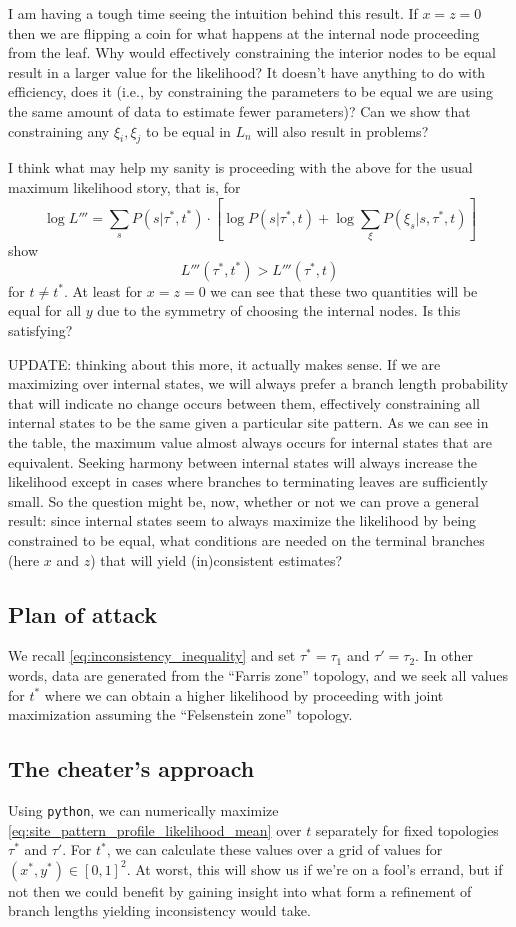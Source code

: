 I am having a tough time seeing the intuition behind this result.
If $x=z=0$ then we are flipping a coin for what happens at the internal node proceeding from the leaf.
Why would effectively constraining the interior nodes to be equal result in a larger value for the likelihood?
It doesn't have anything to do with efficiency, does it (i.e., by constraining the parameters to be equal we are using the same amount of data to estimate fewer parameters)?
Can we show that constraining any $\xi_i,\xi_j$ to be equal in $L_n$ will also result in problems?

I think what may help my sanity is proceeding with the above for the usual maximum likelihood story, that is, for
$$
\log L''' = \sum_{s} P(s | \tau^*, t^*) \cdot [\log P(s | \tau^*, t) + \log\sum_{\xi} P(\xi_s | s, \tau^*, t)]
$$
show
$$
L'''(\tau^*, t^*) > L'''(\tau^*, t)
$$
for $t\neq t^*$.
At least for $x=z=0$ we can see that these two quantities will be equal for all $y$ due to the symmetry of choosing the internal nodes.
Is this satisfying?

UPDATE: thinking about this more, it actually makes sense.
If we are maximizing over internal states, we will always prefer a branch length probability that will indicate no change occurs between them, effectively constraining all internal states to be the same given a particular site pattern.
As we can see in the table, the maximum value almost always occurs for internal states that are equivalent.
Seeking harmony between internal states will always increase the likelihood except in cases where branches to terminating leaves are sufficiently small.
So the question might be, now, whether or not we can prove a general result: since internal states seem to always maximize the likelihood by being constrained to be equal, what conditions are needed on the terminal branches (here $x$ and $z$) that will yield (in)consistent estimates?


\subsection{Plan of attack}

We recall \eqref{eq:inconsistency_inequality} and set $\tau^*=\tau_1$ and $\tau'=\tau_2$.
In other words, data are generated from the ``Farris zone'' topology, and we seek all values for $t^*$ where we can obtain a higher likelihood by proceeding with joint maximization assuming the ``Felsenstein zone'' topology.

\subsection{The cheater's approach}

Using \texttt{python}, we can numerically maximize \eqref{eq:site_pattern_profile_likelihood_mean} over $t$ separately for fixed topologies $\tau^*$ and $\tau'$.
For $t^*$, we can calculate these values over a grid of values for $(x^*, y^*)\in[0,1]^2$.
At worst, this will show us if we're on a fool's errand, but if not then we could benefit by gaining insight into what form a refinement of branch lengths yielding inconsistency would take.

